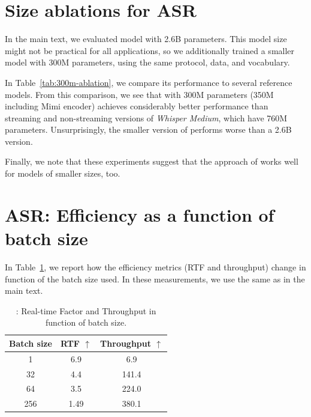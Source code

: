 \section{Size ablations for ASR}
In the main text, we evaluated \oursASR{} model with 2.6B parameters. This model size might not be practical for all applications, so we additionally trained a smaller model with 300M parameters, using the same protocol, data, and vocabulary.

In Table~\ref{tab:300m-ablation}, we  compare its performance to several reference models. From this comparison, we see that \oursASR{} with 300M parameters  (350M including Mimi encoder) achieves considerably better performance than streaming and non-streaming versions of \textit{Whisper Medium}, which have 760M parameters. Unsurprisingly, the smaller version of \oursASR{} performs worse than a 2.6B version.

Finally, we note that these experiments suggest that the approach of \oursASR{} works well for models of smaller sizes, too.

\section{ASR: Efficiency as a function of batch size}
In Table~\ref{tab:bsz-throughput}, we report how the efficiency metrics (RTF and throughput) change in function of the batch size used. In these measurements, we use the same \oursASR{} as in the main text.


\begin{table}[t]
\centering
\caption{{\oursASR{}: Real-time Factor and Throughput in function of batch size}.}
\label{tab:bsz-throughput}
\begin{sc}
\begin{tabular}{ccc}
\toprule
\textbf{Batch size} & \textbf{RTF} $\uparrow$ & \textbf{Throughput} $\uparrow$ \\
\midrule
1 & 6.9 & 6.9 \\
32 & 4.4 & 141.4 \\
64 & 3.5 & 224.0 \\
256 & 1.49 & 380.1 \\
\bottomrule
\end{tabular}
\end{sc}
\end{table}

